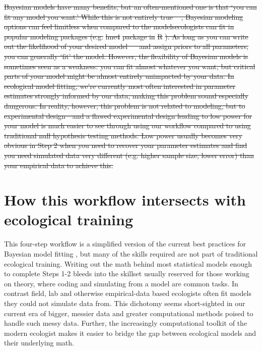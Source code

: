\documentclass[11pt]{article}
\providecommand{\DIFdeltex}[1]{{\protect\color{red}\sout{#1}}}                      %
\providecommand{\DIFdelend}{} %
\providecommand{\DIFdel}[1]{\texorpdfstring{\DIFdeltex{#1}}{}} %
\DeclareRobustCommand{\DIFdelend}{\DIFOaddend \let\includegraphics\DIFOincludegraphics} %
\begin{document}
\DIFdel{Bayesian models have many benefits, but an often-mentioned one is that `you can fit any model you want.' While this is not entirely true \mbox{%
\citep{BDA,reid2019}}\hskip0pt%
, Bayesian modeling options can feel limitless when compared to the modelsecologists can fit in popular modeling packages (e.g. }\textsf{\DIFdel{lme4}} %
\DIFdel{package in }\textsf{\DIFdel{R}}%
\DIFdel{). As long as you can write out the likelihood of your desired model \mbox{%
\citep[and sometimes even if you can't,][]{Sunnaaker2013} }\hskip0pt%
and assign priors to all parameters, you can generally `fit' the model. However, the flexibility of Bayesian models is sometimes seen as a weakness: you can fit almost whatever you want, but critical parts of your model might be almost entirely unimpacted by your data. In ecological model fitting, we're currently most often interested in parameter estimates strongly informed by our data, making this problem sound especially dangerous. In reality, however, this problem is not related to modeling, but to experimental design---and a flawed experimental design leading to low power for your model is much easier to see through using our workflow compared to using traditional null hypothesis testing methods. Low power usually becomes very obvious in Step 2 when you need to recover your parameter estimates and find you need simulated data very different (e.g. higher sample size, lower error) than your empirical data to achieve this.
}%

\DIFdelend \section*{How this workflow intersects with ecological training} %

This four-step workflow is a simplified version of the current best practices for Bayesian model fitting  \citep{betanworkflow,vandeschoot2021}, but many of the skills required are not part of traditional ecological training. Writing out the math behind most statistical models enough to complete Steps 1-2 bleeds into the skillset usually reserved for those working on theory, where coding and simulating from a model are common tasks. In contrast field, lab and otherwise empirical-data based ecologists often fit models they could not simulate data from. This dichotomy seems short-sighted in our current era of bigger, messier data and greater computational methods poised to handle such messy data. Further, the increasingly computational toolkit of the modern ecologist makes it easier to bridge the gap between ecological models and their underlying math. 
\end{document}
